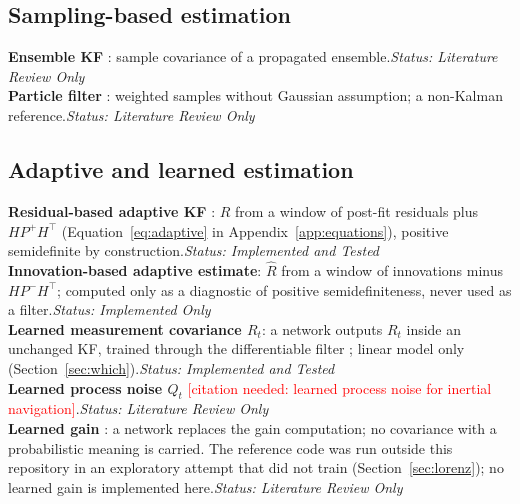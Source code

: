\documentclass[11pt,a4paper]{article}
\newcommand{\todo}[1]{\textcolor{red}{[#1]}}
\newcommand{\status}[1]{\hfill\textit{Status: #1}}
\newcommand{\tp}{^{\top}}
\begin{document}
\subsection{Sampling-based estimation}
\textbf{Ensemble KF} \citep{evensen1994}: sample covariance of a propagated ensemble.\status{Literature Review Only}\\
\textbf{Particle filter} \citep{gordon1993}: weighted samples without Gaussian assumption; a
non-Kalman reference.\status{Literature Review Only}

\subsection{Adaptive and learned estimation}
\textbf{Residual-based adaptive KF} \citep{mehra1970,mohamed1999}: $\hat R$ from a window of
post-fit residuals plus $HP^+H\tp$ (Equation~\eqref{eq:adaptive} in Appendix~\ref{app:equations}),
positive semidefinite by construction.\status{Implemented and Tested}\\
\textbf{Innovation-based adaptive estimate}: $\hat R$ from a window of innovations minus
$HP^-H\tp$; computed only as a diagnostic of positive semidefiniteness, never used as a filter.\status{Implemented Only}\\
\textbf{Learned measurement covariance $R_t$}: a network outputs $R_t$ inside an unchanged KF,
trained through the differentiable filter \citep{haarnoja2016}; linear model only
(Section~\ref{sec:which}).\status{Implemented and Tested}\\
\textbf{Learned process noise $Q_t$} \todo{citation needed: learned process noise for inertial
navigation}.\status{Literature Review Only}\\
\textbf{Learned gain} \citep{revach2022}: a network replaces the gain computation; no covariance
with a probabilistic meaning is carried. The reference code was run outside this repository in an
exploratory attempt that did not train (Section~\ref{sec:lorenz}); no learned gain is implemented
here.\status{Literature Review Only}
\end{document}
